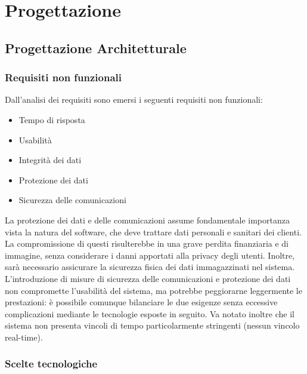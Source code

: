 \newpage
\section{Progettazione}

\subsection{Progettazione Architetturale}

\subsubsection{Requisiti non funzionali}

Dall'analisi dei requisiti sono emersi i seguenti requisiti non funzionali:
\begin{itemize}
\item Tempo di risposta
\item Usabilità
\item Integrità dei dati
\item Protezione dei dati 
\item Sicurezza delle comunicazioni
\end{itemize}
La protezione dei dati e delle comunicazioni assume fondamentale importanza vista la natura del software, 
che deve trattare dati personali e sanitari dei clienti. 
La compromissione di questi risulterebbe in una grave perdita finanziaria e di immagine, senza considerare i danni apportati alla privacy degli utenti. 
Inoltre, sarà necessario assicurare la sicurezza fisica dei dati immagazzinati nel sistema.
L'introduzione di misure di sicurezza delle comunicazioni e protezione dei dati non compromette l'usabilità del sistema, ma potrebbe peggiorarne leggermente le prestazioni: 
è possibile comunque bilanciare le due esigenze senza eccessive complicazioni mediante le tecnologie esposte in seguito. 
Va notato inoltre che il sistema non presenta vincoli di tempo particolarmente stringenti (nessun vincolo real-time).

\subsubsection{Scelte tecnologiche}

